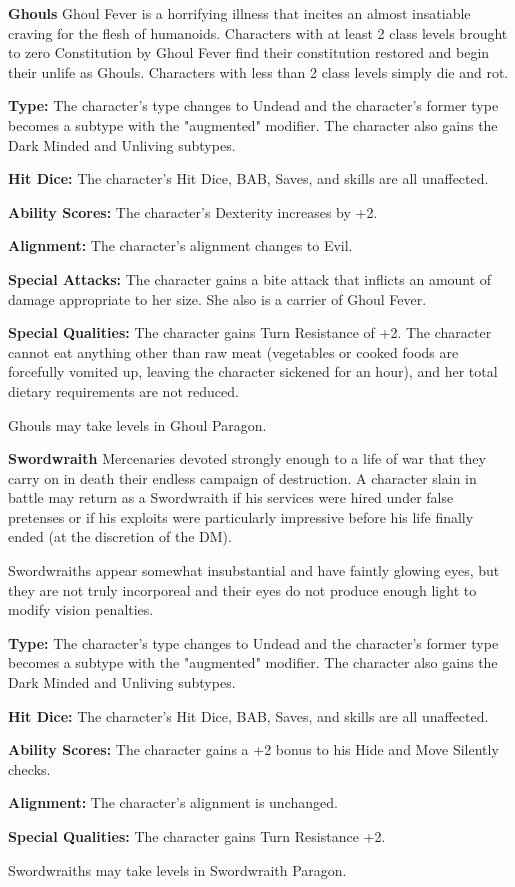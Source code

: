 \textbf{Ghouls}
Ghoul Fever is a horrifying illness that incites an almost insatiable craving for the flesh of humanoids. Characters with at least 2 class levels brought to zero Constitution by Ghoul Fever find their constitution restored and begin their unlife as Ghouls. Characters with less than 2 class levels simply die and rot.
\begin{itemize*}
\item \textbf{Type:} The character's type changes to Undead and the character's former type becomes a subtype with the "augmented" modifier. The character also gains the Dark Minded and Unliving subtypes.
\item \textbf{Hit Dice:} The character's Hit Dice, BAB, Saves, and skills are all unaffected.
\item \textbf{Ability Scores:} The character's Dexterity increases by +2.
\item \textbf{Alignment:} The character's alignment changes to Evil.
\item \textbf{Special Attacks:} The character gains a bite attack that inflicts an amount of damage appropriate to her size. She also is a carrier of Ghoul Fever.
\item \textbf{Special Qualities:} The character gains Turn Resistance of +2. The character cannot eat anything other than raw meat (vegetables or cooked foods are forcefully vomited up, leaving the character sickened for an hour), and her total dietary requirements are not reduced.
\end{itemize*}
Ghouls may take levels in Ghoul Paragon.

\textbf{Swordwraith}
Mercenaries devoted strongly enough to a life of war that they carry on in death their endless campaign of destruction. A character slain in battle may return as a Swordwraith if his services were hired under false pretenses or if his exploits were particularly impressive before his life finally ended (at the discretion of the DM).

Swordwraiths appear somewhat insubstantial and have faintly glowing eyes, but they are not truly incorporeal and their eyes do not produce enough light to modify vision penalties.
\begin{itemize*}
\item \textbf{Type:} The character's type changes to Undead and the character's former type becomes a subtype with the "augmented" modifier. The character also gains the Dark Minded and Unliving subtypes.
\item \textbf{Hit Dice:} The character's Hit Dice, BAB, Saves, and skills are all unaffected.
\item \textbf{Ability Scores:} The character gains a +2 bonus to his Hide and Move Silently checks.
\item \textbf{Alignment:} The character's alignment is unchanged.
\item \textbf{Special Qualities:} The character gains Turn Resistance +2.
\end{itemize*}
Swordwraiths may take levels in Swordwraith Paragon.